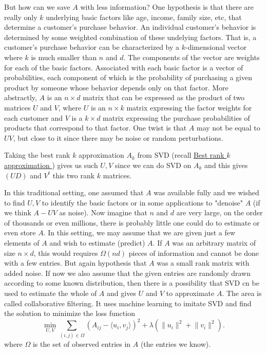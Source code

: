 But how can we save \(A\)  with less information? One hypothesis is that there are really only \(k\) underlying basic factors like age, income, family size, etc, that determine a customer's purchase behavior. An individual customer's behavior is determined by some weighted combination of these undelying factors. That is, a customer's purchase behavior can be characterized by a \(k\)-dimensional vector where \(k\) is much smaller than \(n\) and \(d\). The components of the vector are weights for each of the basic factors. Associated with each basic factor is a vector of probabilities, each component of which is the probability of purchasing a given product by someone whose behavior depends only on that factor. More abstractly, \(A\) is an \(n \times d\) matrix that can be expressed as the product of two matrices \(U\) and \(V\), where \(U\) is an \(n \times k\) matrix expressing the factor weights for each customer and \(V\) is a \(k \times d\) matrix expressing the purchase probabilities of products that correspond to that factor. One twist is that \(A\) may not be equal to \(UV\), but close to it since there may be noise or random perturbations.

Taking the best rank \(k\) approximation \(A_k\) from SVD (recall \hyperref[sec: best rank k approx]{Best rank \(k\) approximation }) gives us such \(U, V\) since we can do SVD on \(A_k\) and this gives \((UD)\) and \(V^t\) this two rank \(k\) matrices.

In this traditional setting, one assumed that \(A\) was available fully and we wished to find \(U,V\) to identify the basic factors or in some applications to "denoise" \(A\) (if we think \(A-UV\) as noise). Now imagine that \(n\) and \(d\) are very large, on the order of thousands or even millions, there is probably little one could do to estimate or even store \(A\). In this setting, we may assume that we are given just a few elements of \(A\) and wish to estimate (predict) \(A\). If \(A\) was an arbitrary matrix of size \(n \times d\), this would requires \(\Omega (nd)\) pieces of information and cannot be done with a few entries. But again hypothesis that \(A\) was a small rank matrix with added noise. If now we also assume that the given entries are randomly drawn according to some known distribution, then there is a possibility that SVD cn be used to estimate the whole of \(A\) and gives \(U\) and \(V\) to approximate \(A\). The area is called collaborative filtering.  It uses machine learning to imitate SVD and find the solution to minimize the loss function
\[
  \min _{U, V} \sum_{(i,j) \in \Omega } \left( A_{ij} - \langle u_i, v_j \rangle  \right)^2 + \lambda \left( \lVert u_i \rVert^2 + \lVert v_i \rVert^2   \right).   
\]      
where \(\Omega \) is the set of observed entries in \(A\) (the entries we know).       


